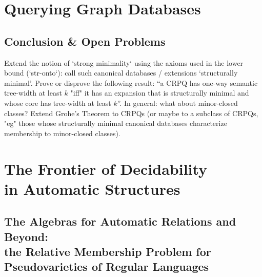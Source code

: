 \documentclass[a4paper,sfsidenotes,twoside,justified,nobib]{tufte-book-custom}
\begin{document}




\part{Querying Graph Databases}






\chapter{Conclusion \& Open Problems}

Extend the notion of `strong minimality` using the axioms used in the lower bound (`str-onto`): call such canonical databases / extensions `structurally minimal'.
Prove or disprove the following result: ``a CRPQ has one-way semantic tree-width at least $k$ "iff" it has an expansion that is structurally minimal and whose core has tree-width at least $k$''. In general: what about minor-closed classes?
Extend Grohe's Theorem to CRPQs (or maybe to a subclass of CRPQs, "eg" those whose
structurally minimal canonical databases characterize membership to minor-closed classes).

\part[The Frontier of Decidability in Automatic Structures]{The Frontier of Decidability\\in Automatic Structures}




\chapter[Relative Membership for Pseudovarieties of Regular Languages]{The Algebras for Automatic Relations and Beyond: \\the Relative Membership Problem for Pseudovarieties of Regular Languages}
\end{document}
